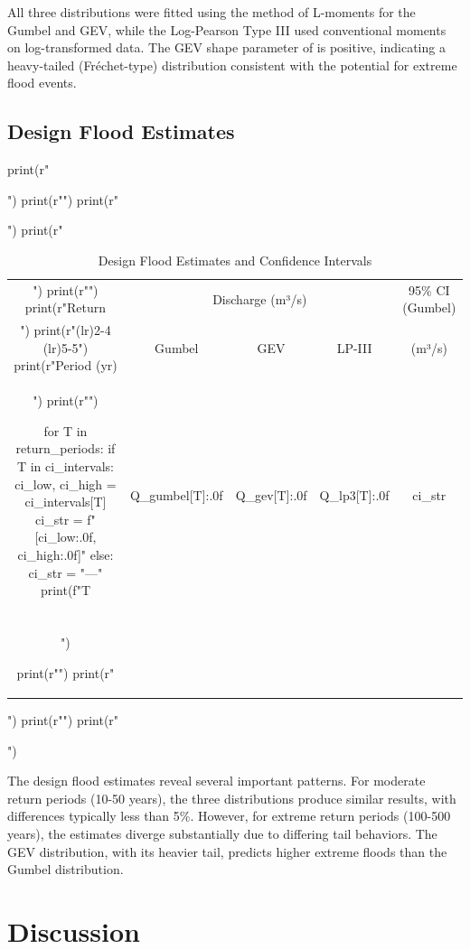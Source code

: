 \documentclass[a4paper, 11pt]{article}
\begin{document}
All three distributions were fitted using the method of L-moments for the Gumbel and GEV,
while the Log-Pearson Type III used conventional moments on log-transformed data. The GEV
shape parameter of  is positive, indicating a heavy-tailed (Fréchet-type)
distribution consistent with the potential for extreme flood events.

\subsection{Design Flood Estimates}

\begin{pycode}
print(r"\begin{table}[htbp]")
print(r"\centering")
print(r"\caption{Design Flood Estimates and Confidence Intervals}")
print(r"\begin{tabular}{ccccc}")
print(r"\toprule")
print(r"Return & \multicolumn{3}{c}{Discharge (m³/s)} & 95\% CI (Gumbel) \\")
print(r"\cmidrule(lr){2-4} \cmidrule(lr){5-5}")
print(r"Period (yr) & Gumbel & GEV & LP-III & (m³/s) \\")
print(r"\midrule")

for T in return_periods:
    if T in ci_intervals:
        ci_low, ci_high = ci_intervals[T]
        ci_str = f"[{ci_low:.0f}, {ci_high:.0f}]"
    else:
        ci_str = "---"
    print(f"{T} & {Q_gumbel[T]:.0f} & {Q_gev[T]:.0f} & {Q_lp3[T]:.0f} & {ci_str} \\\\")

print(r"\bottomrule")
print(r"\end{tabular}")
print(r"\label{tab:design_floods}")
print(r"\end{table}")
\end{pycode}

The design flood estimates reveal several important patterns. For moderate return periods
(10-50 years), the three distributions produce similar results, with differences typically
less than 5\%. However, for extreme return periods (100-500 years), the estimates diverge
substantially due to differing tail behaviors. The GEV distribution, with its heavier tail,
predicts higher extreme floods than the Gumbel distribution.

\section{Discussion}
\end{document}
